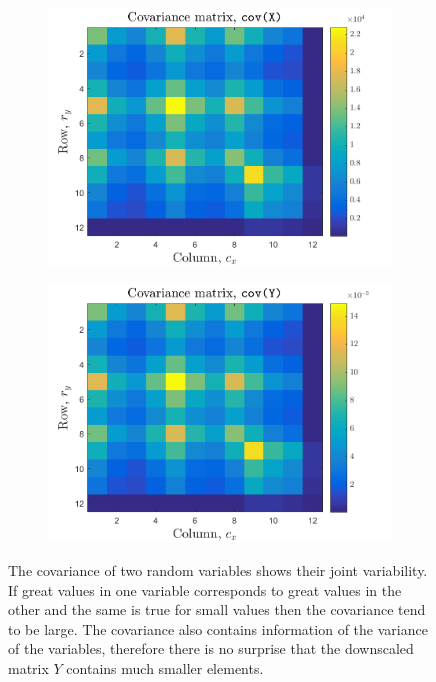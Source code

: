 \documentclass{article}
\begin{document}
\begin{figure}[H]
    \centering
    \begin{subfigure}[b]{0.40\textwidth}
        \centering
        \includegraphics[width=\textwidth]{Figures/plot2_2_cov_x.png}
    \end{subfigure}
    \begin{subfigure}[b]{0.40\textwidth}
        \centering
        \includegraphics[width=\textwidth]{Figures/plot2_2_cov_y.png}
    \end{subfigure}
    \caption{\label{fig:cov} The covariance of two random variables shows their joint variability. If great values in one variable corresponds to great values in the other and the same is true for small values then the covariance tend to be large. The covariance also contains information of the variance of the variables, therefore there is no surprise that the downscaled matrix $Y$ contains much smaller elements.}
\end{figure}
\end{document}

